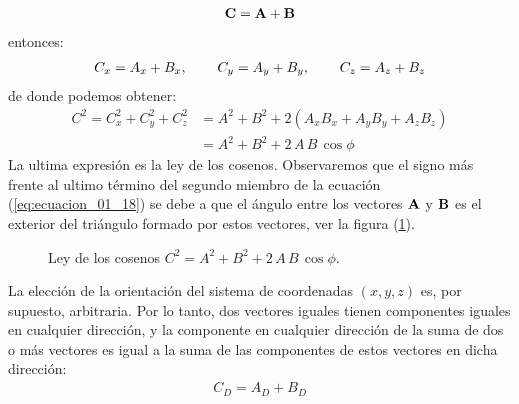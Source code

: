 \documentclass[12pt]{article}
\begin{document}
\begin{align}
    \vb{C} = \vb{A} + \vb{B}
    \label{eq:ecuacion_01_16}
\end{align}
entonces:
\begin{align}
    C_{x} = A_{x} + B_{x}, \hspace{0.75cm} C_{y} = A_{y} + B_{y}, \hspace{0.75cm} C_{z} = A_{z} + B_{z} \label{eq:ecuacion_01_17}
\end{align}
de donde podemos obtener:
\begin{align}
    C^{2} = C_{x}^{2} + C_{y}^{2} + C_{z}^{2} &= A^{2} + B^{2} + 2 \left( A_{x} B_{x} + A_{y} B_{y} + A_{z} B_{z} \right) \nonumber \\[0.5em]
    &= A^{2} + B^{2} + 2 \, A \, B \, \cos \phi \label{eq:ecuacion_01_18}
\end{align}
La ultima expresión es la ley de los cosenos. Observaremos que el signo más frente al ultimo término del segundo miembro de la ecuación (\ref{eq:ecuacion_01_18}) se debe a que el ángulo entre los vectores $\vb{A}$ y $\vb{B}$ es el exterior del triángulo formado por estos vectores, ver la figura (\ref{fig:figura_01_09}). 
\begin{figure}[H]
    \centering
    \caption{Ley de los cosenos $C^{2} = A^{2} + B^{2} + 2 \, A \, B \, \cos \phi$.}
    \label{fig:figura_01_09}
\end{figure}
La elección de la orientación del sistema de coordenadas $(x, y, z)$ es, por supuesto, arbitraria. Por lo tanto, dos vectores iguales tienen componentes iguales en cualquier dirección, y la componente en cualquier dirección de la suma de dos o más vectores es igual a la suma de las componentes de estos vectores en dicha dirección:
\begin{align}
    C_{D} = A_{D} + B_{D}
    \label{eq:ecuacion_01_19}
\end{align}
\end{document}
